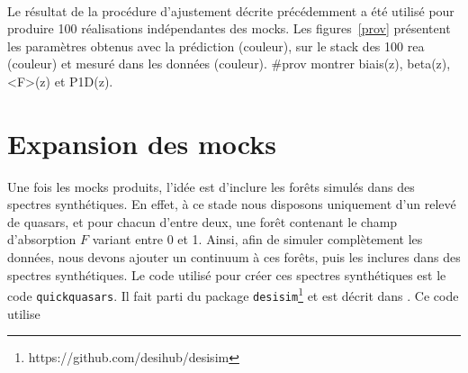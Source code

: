 \documentclass[11pt, twoside, a4paper, openright]{report}
\begin{document}
\paragraph{}
Le résultat de la procédure d'ajustement décrite précédemment a été utilisé pour produire \num{100} réalisations indépendantes des mocks. Les figures~\ref{prov} présentent les paramètres \lya{} obtenus avec la prédiction (couleur), sur le stack des 100 rea (couleur) et mesuré dans les données (couleur). \#prov montrer biais(z), beta(z), <F>(z) et P1D(z).



\section{Expansion des mocks}
\label{sec:quickquasars}

Une fois les mocks produits, l'idée est d'inclure les forêts simulés dans des spectres synthétiques. En effet, à ce stade nous disposons uniquement d'un relevé de quasars, et pour chacun d'entre deux, une forêt contenant le champ d'absorption $F$ variant entre 0 et 1. Ainsi, afin de simuler complètement les données, nous devons ajouter un continuum à ces forêts, puis les inclures dans des spectres synthétiques. Le code utilisé pour créer ces spectres synthétiques est le code \texttt{quickquasars}. Il fait parti du package \texttt{desisim}\footnote{https://github.com/desihub/desisim} et est décrit dans \textcite{prov alma in prep}. Ce code utilise 



% 
\end{document}

